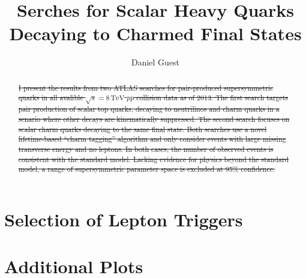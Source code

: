 \documentclass{report}
\title{Serches for Scalar Heavy Quarks Decaying to Charmed Final States}
\author{Daniel Guest}
\newcommand{\cmenergy}{\sqrt{s} = 8\,\text{TeV}}
\begin{document}
\maketitle
\tableofcontents

\begin{abstract}
\sout{I present the results from two ATLAS searches for pair-produced
supersymmetric quarks in all avalible $\cmenergy$ $pp$ collision data as
of 2013. The first search targets pair production of scalar top quarks,
decaying to neutrilinos and charm quarks in a senario where other
decays are kinematically suppressed. The second search focuses
on scalar charm quarks decaying to the same final state. Both searches
use a novel lifetime-based ``charm tagging'' algorithm
and only consider events with large missing transverse
energy and no leptons. In both cases, the number of observed events is
consistent with the standard model. Lacking evidence for physics
beyond the standard model, a range of supersymmetric parameter space is
excluded at 95\% confidence.}
\end{abstract}






\appendix
\appendixpage
\addappheadtotoc

\chapter{Selection of Lepton Triggers}
\label{sec:dilepton-triggers}

\chapter{Additional Plots}





\end{document}
